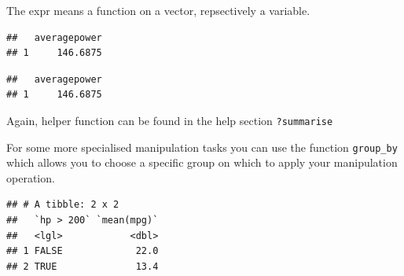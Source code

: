 \documentclass[]{report}
\newenvironment{Shaded}{\begin{snugshade}}{\end{snugshade}}
\newcommand{\KeywordTok}[1]{\textcolor[rgb]{0.13,0.29,0.53}{\textbf{#1}}}
\newcommand{\DataTypeTok}[1]{\textcolor[rgb]{0.13,0.29,0.53}{#1}}
\newcommand{\DecValTok}[1]{\textcolor[rgb]{0.00,0.00,0.81}{#1}}
\newcommand{\StringTok}[1]{\textcolor[rgb]{0.31,0.60,0.02}{#1}}
\newcommand{\CommentTok}[1]{\textcolor[rgb]{0.56,0.35,0.01}{\textit{#1}}}
\newcommand{\OperatorTok}[1]{\textcolor[rgb]{0.81,0.36,0.00}{\textbf{#1}}}
\newcommand{\NormalTok}[1]{#1}
\begin{document}
The expr means a function on a vector, repsectively a variable.

\begin{Shaded}
\end{Shaded}

\begin{verbatim}
##   averagepower
## 1     146.6875
\end{verbatim}

\begin{Shaded}
\end{Shaded}

\begin{verbatim}
##   averagepower
## 1     146.6875
\end{verbatim}

Again, helper function can be found in the help section
\texttt{?summarise}

For some more specialised manipulation tasks you can use the function
\texttt{group\_by} which allows you to choose a specific group on which
to apply your manipulation operation.

\begin{Shaded}
\end{Shaded}

\begin{verbatim}
## # A tibble: 2 x 2
##   `hp > 200` `mean(mpg)`
##   <lgl>            <dbl>
## 1 FALSE             22.0
## 2 TRUE              13.4
\end{verbatim}
\end{document}
